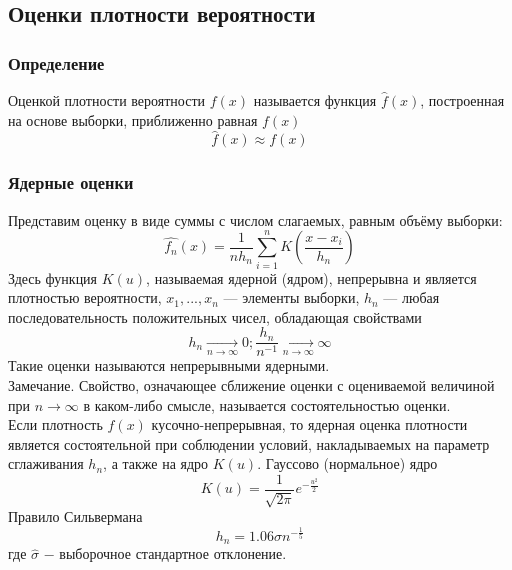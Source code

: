 \subsection{Оценки плотности вероятности}
	\subsubsection{Определение}
		Оценкой плотности вероятности $f(x)$ называется функция $\hat{f}(x)$, построенная на основе выборки, приближенно равная $f(x)$
		\begin{equation}
			{\hat{f}(x) \approx f(x)}
		\end{equation}
	\subsubsection{Ядерные оценки}	
		Представим оценку в виде суммы с числом слагаемых, равным объёму выборки:
		\begin{equation}
			{\hat{f_n}(x) = \frac{1}{nh_n}\sum\limits_{i=1}^{n}K(\frac{x-x_i}{h_n})}
		\end{equation}
		Здесь функция $K(u)$, называемая ядерной (ядром), непрерывна и является
		плотностью вероятности, $x_1, ..., x_n$ — элементы выборки, ${h_n}$ — любая
		последовательность положительных чисел, обладающая свойствами
		\begin{equation}
			{h_n \xrightarrow[n\to\infty]{}0; \frac{h_n}{n^{-1}} \xrightarrow[n\to\infty]{}\infty}
		\end{equation}
		Такие оценки называются непрерывными ядерными.\\
		
		Замечание. Свойство, означающее сближение оценки с оцениваемой величиной при $n\to\infty$ в каком-либо смысле, называется состоятельностью оценки. \\
		Если плотность $f(x)$ кусочно-непрерывная, то ядерная оценка плотности
		является состоятельной при соблюдении условий, накладываемых на параметр сглаживания $h_n$, а также на ядро $K(u)$.
		Гауссово (нормальное) ядро
		\begin{equation}
			{K(u)=\frac{1}{\sqrt{2\pi}}e^{-\frac{u^2}{2}}}
		\end{equation}
		Правило Сильвермана
		\begin{equation}
			{h_n = 1.06\hat{\sigma}n^{-\frac{1}{5}}}
		\end{equation}
		где $\hat{\sigma}$ $-$ выборочное стандартное отклонение.